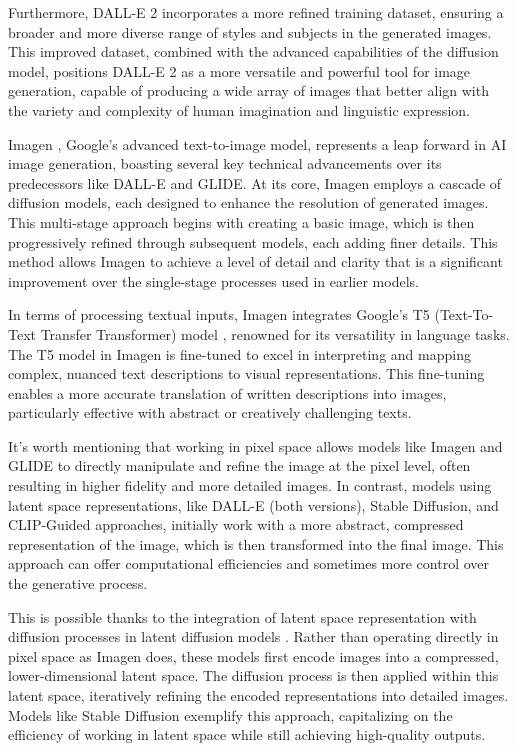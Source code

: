 \documentclass[12pt, letterpaper]{article}
\begin{document}
Furthermore, DALL-E 2 incorporates a more refined training dataset, ensuring a broader and more diverse range of styles and subjects in the generated images. This improved dataset, combined with the advanced capabilities of the diffusion model, positions DALL-E 2 as a more versatile and powerful tool for image generation, capable of producing a wide array of images that better align with the variety and complexity of human imagination and linguistic expression.

Imagen \cite{saharia2022photorealistic}, Google's advanced text-to-image model, represents a leap forward in AI image generation, boasting several key technical advancements over its predecessors like DALL-E and GLIDE. At its core, Imagen employs a cascade of diffusion models, each designed to enhance the resolution of generated images. This multi-stage approach begins with creating a basic image, which is then progressively refined through subsequent models, each adding finer details. This method allows Imagen to achieve a level of detail and clarity that is a significant improvement over the single-stage processes used in earlier models.

In terms of processing textual inputs, Imagen integrates Google's T5 (Text-To-Text Transfer Transformer) model \cite{raffel2023exploring}, renowned for its versatility in language tasks. The T5 model in Imagen is fine-tuned to excel in interpreting and mapping complex, nuanced text descriptions to visual representations. This fine-tuning enables a more accurate translation of written descriptions into images, particularly effective with abstract or creatively challenging texts.

It's worth mentioning that working in pixel space allows models like Imagen and GLIDE to directly manipulate and refine the image at the pixel level, often resulting in higher fidelity and more detailed images. In contrast, models using latent space representations, like DALL-E (both versions), Stable Diffusion, and CLIP-Guided approaches, initially work with a more abstract, compressed representation of the image, which is then transformed into the final image. This approach can offer computational efficiencies and sometimes more control over the generative process.

This is possible thanks to the integration of latent space representation with diffusion processes in latent diffusion models \cite{rombach2021highresolution}. Rather than operating directly in pixel space as Imagen does, these models first encode images into a compressed, lower-dimensional latent space. The diffusion process is then applied within this latent space, iteratively refining the encoded representations into detailed images. Models like Stable Diffusion exemplify this approach, capitalizing on the efficiency of working in latent space while still achieving high-quality outputs.
\end{document}

